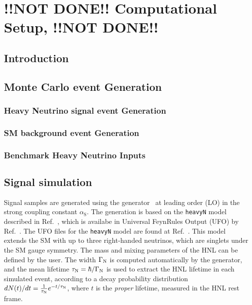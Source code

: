 \chapter{!!NOT DONE!! Computational Setup, !!NOT DONE!!} %

\label{Chapter4} %


\section{Introduction}

\section{Monte Carlo event Generation}
\subsection{Heavy Neutrino signal event Generation}
\subsection{SM background event Generation}
\subsection{Benchmark Heavy Neutrino Inputs}

\section{Signal simulation}
\label{sec:signal}

Signal samples are generated using the \MGvATNLO
generator~\cite{Alwall:2014hca} at leading order (LO) in the strong
coupling constant $\alpha_{\mathrm{S}}$.
The generation is based on the \texttt{heavyN} model described in
Ref.~\cite{Atre:2009rg}, which is availabe in Universal FeynRules
Output (UFO) by Ref.~\cite{Alva:2014gxa,Degrande:2016aje}.
The UFO files for the \texttt{heavyN} model are found at
Ref.~\cite{heavyN}.
This model extends the SM with up to three right-handed neutrinos,
which are singlets under the SM gauge symmetry.
The mass and mixing parameters of the HNL can be defined by the user.
The width $\Gamma_{\mathrm{N}}$ is computed automatically by the
generator, and the mean lifetime $\tau_{\mathrm{N}} = \hbar/\Gamma_{\mathrm{N}}$
is used to extract the HNL lifetime in each simulated event,
according to a decay probability distribution
$dN(t)/dt = \frac{1}{\tau_{\mathrm{N}}}e^{-t/\tau_{\mathrm{N}}}$, where $t$ is the
\emph{proper} lifetime, measured in the HNL rest frame.

